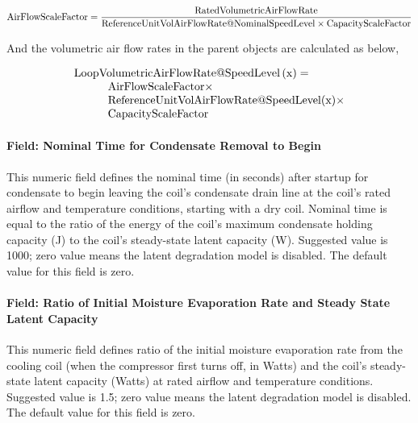 \begin{equation}
\rm{AirFlowScaleFactor} = \frac{\rm{RatedVolumetricAirFlowRate}}{\rm{ReferenceUnitVolAirFlowRate} @ \rm{NominalSpeedLevel} \times \rm{CapacityScaleFactor}}
\end{equation}

And the volumetric air flow rates in the parent objects are calculated as below,

\begin{equation}
  \begin{array}{l}
    \rm{LoopVolumetricAirFlowRate} @ \rm{SpeedLevel} \left( \rm{x} \right) = \\
    \quad \quad \quad \rm{AirFlowScaleFactor} \times \\
    \quad \quad \quad \rm{ReferenceUnitVolAirFlowRate} @ \rm{SpeedLevel}(\rm{x}) \times \\
    \quad \quad \quad \rm{CapacityScaleFactor}
  \end{array}
\end{equation}

\paragraph{Field: Nominal Time for Condensate Removal to Begin}\label{field-nominal-time-for-condensate-removal-to-begin-1}

This numeric field defines the nominal time (in seconds) after startup for condensate to begin leaving the coil's condensate drain line at the coil's rated airflow and temperature conditions, starting with a dry coil. Nominal time is equal to the ratio of the energy of the coil's maximum condensate holding capacity (J) to the coil's steady-state latent capacity (W). Suggested value is 1000; zero value means the latent degradation model is disabled. The default value for this field is zero.

\paragraph{Field: Ratio of Initial Moisture Evaporation Rate and Steady State Latent Capacity}\label{field-ratio-of-initial-moisture-evaporation-rate-and-steady-state-latent-capacity-1}

This numeric field defines ratio of the initial moisture evaporation rate from the cooling coil (when the compressor first turns off, in Watts) and the coil's steady-state latent capacity (Watts) at rated airflow and temperature conditions. Suggested value is 1.5; zero value means the latent degradation model is disabled. The default value for this field is zero.

